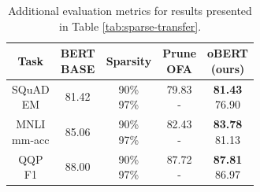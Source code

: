 \documentclass[11pt]{article}
\begin{document}
\begin{table}[htb!]
    \centering
    {\small 
    \begin{tabular}{ccc|c|c}
    \toprule 
    Task & \makecell{BERT\\\small{BASE}} & Sparsity & \makecell{Prune\\OFA} & \makecell{oBERT\\(ours)} \\
    \midrule
    \makecell{SQuAD \\ EM} & 81.42 & \makecell{90\% \\ 97\%} & \makecell{79.83 \\ -} & \makecell{\textbf{81.43} \\ 76.90} \\
    \midrule
    \makecell{MNLI \\ mm-acc} & 85.06 & \makecell{90\% \\ 97\%} & \makecell{82.43 \\ -} & \makecell{\textbf{83.78} \\ 81.13} \\
    \midrule
    \makecell{QQP \\ F1} & 88.00 & \makecell{90\% \\ 97\%} & \makecell{87.72 \\ -} & \makecell{\textbf{87.81} \\ 86.97} \\
    \bottomrule
    \end{tabular}
    }
    \caption{Additional evaluation metrics for results presented in Table \ref{tab:sparse-transfer}.}
    \label{tab:upstream-additional}
\end{table}
\end{document}

